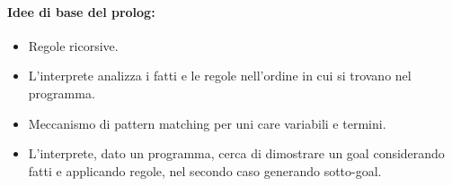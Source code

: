 \paragraph{Idee di base del prolog:}

\begin{itemize}
  \item Regole ricorsive.
  \item L'interprete analizza i fatti e le regole nell'ordine in cui si trovano nel programma. 
  \item Meccanismo di pattern matching per uni care
variabili e termini. 
\item L’interprete, dato un programma, cerca di
dimostrare un goal considerando fatti e applicando
regole, nel secondo caso generando sotto-goal.
\end{itemize}












